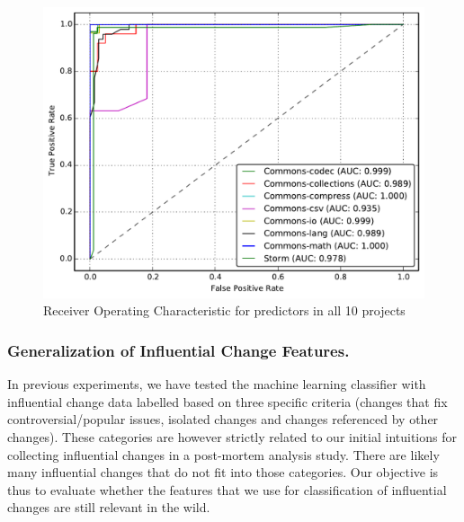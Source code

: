 \begin{figure}
\centering
	\includegraphics[width=0.8\linewidth]{fig/roc}
	\caption{Receiver Operating Characteristic for predictors in all 10 projects}
	\label{fig:auroc}
\end{figure}


\subsubsection{Generalization of Influential Change Features.}
In previous experiments, we have tested the machine learning classifier with
influential change data labelled based on three specific criteria (changes that
fix controversial/popular issues, isolated changes and changes referenced by other changes).
These categories are however strictly related to our initial intuitions for collecting influential
changes in a post-mortem analysis study. There are likely many influential changes that do not
fit into those categories. Our objective is thus to evaluate whether the features that we
use for classification of influential changes are still relevant in the wild.



